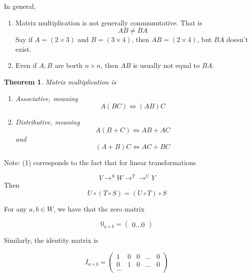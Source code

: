 \documentclass{article}
\newtheorem{theorem}{Theorem}[section]
\newtheorem{one minute paper}[theorem]{One Minute Paper}
\begin{document}
In general, 

\begin{enumerate}
    \item Matrix multiplication is not generally communutative. That is 
    \begin{equation}
        AB \neq BA
    \end{equation}
    Say if $A = (2 \times 3)$ and $B = (3 \times 4)$, then $AB = (2 \times 4)$, but $BA$ doesn't exist.
    \item Even if $A,B$ are borth $n \times n$, then $AB$ is usually not equal to $BA$.
\end{enumerate}

\begin{theorem}
    Matrix multiplication is 
    \begin{enumerate}
        \item Associative, meaning 
        \begin{equation}
            A(BC) \iff (AB)C
        \end{equation}
        \item Distributive, meaning 
        \begin{equation}
            A(B + C) \iff AB + AC
        \end{equation}
        and 
        \begin{equation}
            (A+B)C \iff AC + BC
        \end{equation}
    \end{enumerate}
\end{theorem}

Note: (1) corresponds to the fact that for linear transformations

\begin{equation}
    V \rightarrow^S W \rightarrow^T \rightarrow^U Y
\end{equation}
Then 
\begin{equation}
    U \circ (T \circ S) = (U \circ T) \circ S
\end{equation}

For any $a,b \in W$, we have that the zero matrix 

\begin{equation}
    0_{a\times b} = \begin{pmatrix}
         0 \dots 0
    \end{pmatrix}
\end{equation}

Similarly, the identity matrix is 

\begin{equation}
    I_{a \times b} = \begin{pmatrix}
        1 & 0 & 0 & \dots & 0 \\
        0 & 1 & 0 & \dots & 0 \\
        \dots 
    \end{pmatrix}
\end{equation}
\end{document}
